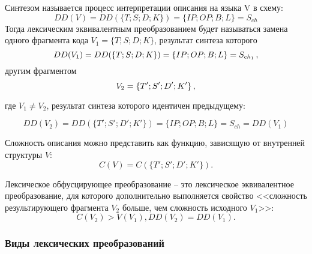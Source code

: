 Синтезом называется процесс интерпретации описания на языка V в схему:
\begin{equation}
  DD(V) = DD(\{T;S;D;K\}) = \{IP;OP;B;L\} = S_{ch}
  \label{eq:domain:lexical:synthesis}
\end{equation}
Тогда лексическим эквивалентным преобразованием будет называться замена одного фрагмента кода $V_1 = \{T;S;D;K\}$, результат синтеза которого
\begin{equation}
  DD(V_1) = DD(\{T;S;D;K\}) = \{IP;OP;B;L\} = S_{ch_1}\text{\,,}
  \label{eq:domain:lexical:equantinal_transform}
\end{equation}
другим фрагментом
\begin{equation}
  V_2 = \{T';S';D';K'\} \text{\,,}
  \label{eq:domain:lexical:equation_second}
\end{equation}
\begin{explanation}
  где $V_1 \neq V_2$, результат синтеза которого идентичен предыдущему:
\end{explanation}
\begin{equation}
  DD(V_2) = DD(\{T';S';D';K'\}) = \{IP;OP;B;L\} = S_{ch} = DD(V_1)
  \label{eq:domain:lexical:final_synth_equation}
\end{equation}

Сложность описания можно представить как функцию, зависящую от внутренней структуры $V$:
\begin{equation}
  C(V) = C(\{T';S';D';K'\}).
  \label{eq:domain:lexical:final_synth_equation}
\end{equation}

Лексическое обфусцирующее преобразование -- это лексическое эквивалентное преобразование, для которого дополнительно выполняется свойство <<сложность результирующего фрагмента $V_2$ больше, чем сложность исходного $V_1$>>:
\begin{equation}
  C(V_2) > V(V_1), DD(V_2) = DD(V_1).
  \label{eq:domain:lexical:final_synth_equation}
\end{equation}
\subsubsection{Виды лексических преобразований}

